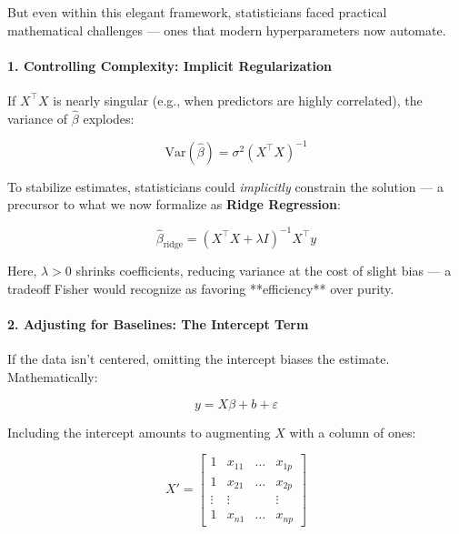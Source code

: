 \medskip

But even within this elegant framework, statisticians faced practical mathematical challenges — ones that modern hyperparameters now automate.

\medskip

\begin{tcolorbox}[title=\textbf{Mathematical Considerations: Fisher-Era Decisions}, colback=gray!5, colframe=black, fonttitle=\bfseries]

\vspace{-0.5em}

\paragraph{1. Controlling Complexity: Implicit Regularization}
If \( X^\top X \) is nearly singular (e.g., when predictors are highly correlated), the variance of \( \hat{\beta} \) explodes:

\[
\mathrm{Var}(\hat{\beta}) = \sigma^2 (X^\top X)^{-1}
\]

To stabilize estimates, statisticians could \emph{implicitly} constrain the solution — a precursor to what we now formalize as \textbf{Ridge Regression}:

\[
\hat{\beta}_{\text{ridge}} = (X^\top X + \lambda I)^{-1} X^\top y
\]

Here, \( \lambda > 0 \) shrinks coefficients, reducing variance at the cost of slight bias — a tradeoff Fisher would recognize as favoring **efficiency** over purity.

\medskip

\paragraph{2. Adjusting for Baselines: The Intercept Term}
If the data isn’t centered, omitting the intercept biases the estimate. Mathematically:

\[
y = X\beta + b + \varepsilon
\]

Including the intercept amounts to augmenting \( X \) with a column of ones:

\[
X' = 
\begin{bmatrix}
1 & x_{11} & \dots & x_{1p} \\
1 & x_{21} & \dots & x_{2p} \\
\vdots & \vdots & & \vdots \\
1 & x_{n1} & \dots & x_{np}
\end{bmatrix}
\]


\end{tcolorbox}
